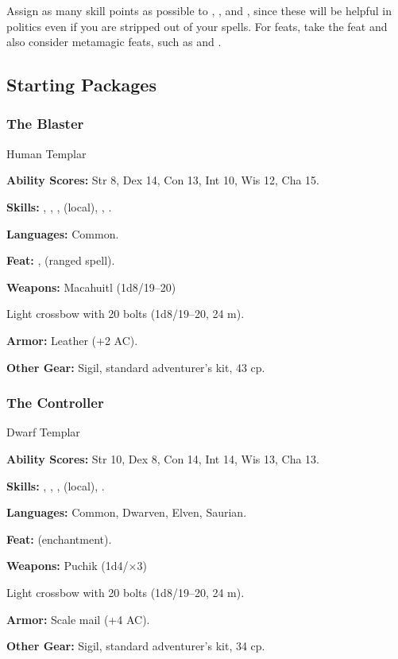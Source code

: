 Assign as many skill points as possible to , , and , since these will be helpful in politics even if you are stripped out of your spells. For feats, take the  feat and also consider metamagic feats, such as  and .


\subsection{Starting Packages}
\subsubsection{The Blaster}
Human Templar

\textbf{Ability Scores:} Str 8, Dex 14, Con 13, Int 10, Wis 12, Cha 15.

\textbf{Skills:} , , ,  (local), , .

\textbf{Languages:} Common.

\textbf{Feat:} ,  (ranged spell).

\textbf{Weapons:} Macahuitl (1d8/19--20)

Light crossbow with 20 bolts (1d8/19--20, 24 m).

\textbf{Armor:} Leather (+2 AC).

\textbf{Other Gear:} Sigil, standard adventurer's kit, 43 cp.

\subsubsection{The Controller}
Dwarf Templar

\textbf{Ability Scores:} Str 10, Dex 8, Con 14, Int 14, Wis 13, Cha 13.

\textbf{Skills:} , , ,  (local), .

\textbf{Languages:} Common, Dwarven, Elven, Saurian.

\textbf{Feat:}  (enchantment).

\textbf{Weapons:} Puchik (1d4/$\times$3)

Light crossbow with 20 bolts (1d8/19--20, 24 m).

\textbf{Armor:} Scale mail (+4 AC).

\textbf{Other Gear:} Sigil, standard adventurer's kit, 34 cp.

